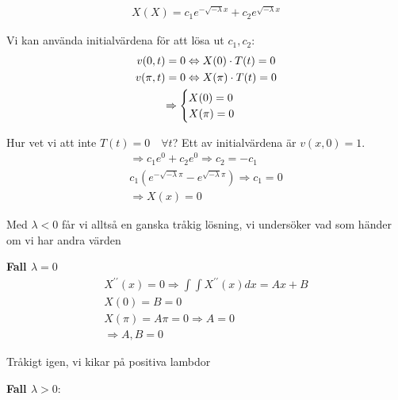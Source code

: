\begin{equation*}
  \begin{gathered}
    X(X) = c_1e^{-\sqrt{-\lambda}x}+c_2e^{\sqrt{-\lambda}x}
  \end{gathered}
\end{equation*}
\par\bigskip
\noindent Vi kan använda initialvärdena för att lösa ut $c_1,c_2$:
\begin{equation*}
  \begin{gathered}
    v(0,t) = 0\Leftrightarrow X(0)\cdot T(t) = 0\\
    v(\pi,t) = 0\Leftrightarrow X(\pi)\cdot T(t) = 0\\
    \Rightarrow\begin{cases}X(0) = 0\\X(\pi) = 0\end{cases}
  \end{gathered}
\end{equation*}\par
\noindent Hur vet vi att inte $T(t) = 0\quad\forall t$? Ett av initialvärdena är $v(x,0) = 1$.
\begin{equation*}
  \begin{gathered}
    \Rightarrow c_1e^{0}+c_2e^{0} \Rightarrow c_2 = -c_1\\
    c_1\left(e^{-\sqrt{-\lambda}\pi}-e^{\sqrt{-\lambda}\pi}\right)\Rightarrow c_1 = 0\\
    \Rightarrow X(x) = 0
  \end{gathered}
\end{equation*}
\par\bigskip
\noindent Med $\lambda<0$ får vi alltså en ganska tråkig lösning, vi undersöker vad som händer om vi har andra värden
\par\bigskip
\noindent\textbf{Fall $\lambda = 0$}
\begin{equation*}
  \begin{gathered}
    X^{\prime\prime}(x) = 0\Rightarrow \int\int X^{\prime\prime}(x) dx = Ax+B\\
    X(0) = B = 0\\
    X(\pi) = A\pi =0\Rightarrow A = 0\\
    \Rightarrow A,B = 0
  \end{gathered}
\end{equation*}
\par\bigskip
\noindent Tråkigt igen, vi kikar på positiva lambdor
\par\bigskip
\noindent\textbf{Fall $\lambda>0$}:
\par\bigskip
